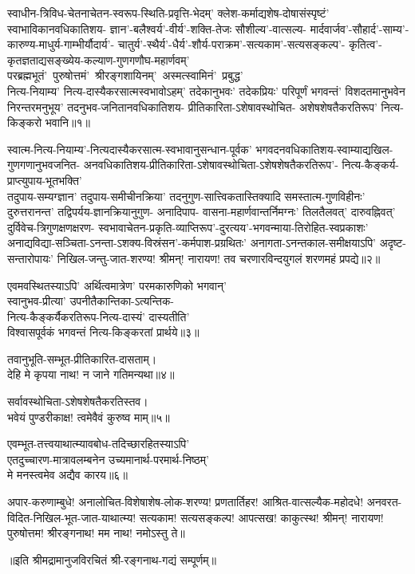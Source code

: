 
\begin{flushleft}
स्वाधीन-त्रिविध-चेतनाचेतन-स्वरूप-स्थिति-प्रवृत्ति-भेदम्'
क्लेश-कर्माद्यशेष-दोषासंस्पृष्टं' स्वाभाविकानवधिकातिशय-
ज्ञान'-बलैश्वर्य'-वीर्य'-शक्ति-तेजः सौशील्य'-वात्सल्य-
मार्दवार्जव'-सौहार्द'-साम्य'-कारुण्य-माधुर्य-गाम्भीर्यौदार्य'-
चातुर्य'-स्थैर्य'-धैर्य'-शौर्य-पराक्रम'-सत्यकाम'-सत्यसङ्कल्प'-
कृतित्व'-कृतज्ञताद्यसङ्ख्येय-कल्याण-गुणगणौघ-महार्णवम्'
\mbox{परब्रह्मभूतं' पुरुषोत्तमं' श्रीरङ्गशायिनम्' अस्मत्स्वामिनं' प्रबुद्ध'}\\
नित्य-नियाम्य' नित्य-दास्यैकरसात्मस्वभावोऽहम्'
तदेकानुभवः' तदेकप्रियः' परिपूर्णं भगवन्तं'
विशदतमानुभवेन निरन्तरमनुभूय' तदनुभव-जनितानवधिकातिशय-%
प्रीतिकारिता-ऽशेषावस्थोचित-
अशेषशेषतैकरतिरूप' नित्य-किङ्करो भवानि॥१॥


स्वात्म-नित्य-नियाम्य'-नित्यदास्यैकरसात्म-स्वभावानुसन्धान-पूर्वक'
भगवदनवधिकातिशय-स्वाम्याद्यखिल-गुणगणानुभवजनित-
अनवधिकातिशय-प्रीतिकारिता-ऽशेषावस्थोचिता-ऽशेषशेषतैकरतिरूप'-%
नित्य-कैङ्कर्य-प्राप्त्युपाय-भूतभक्ति'\\
तदुपाय-सम्यग्ज्ञान' तदुपाय-समीचीनक्रिया'
तदनुगुण-सात्त्विकतास्तिक्यादि समस्तात्म-गुणविहीनः'
दुरुत्तरानन्त' तद्विपर्यय-ज्ञानक्रियानुगुण-%
अनादिपाप- वासना-महार्णवान्तर्निमग्नः'
तिलतैलवत्' दारुवह्निवत्' दुर्विवेच-त्रिगुणक्षणक्षरण-%
स्वभावाचेतन-प्रकृति-व्याप्तिरूप'-दुरत्यय'-भगवन्माया-तिरोहित-स्वप्रकाशः'
अनाद्यविद्या-सञ्चिता-ऽनन्ता-ऽशक्य-विस्रंसन'-कर्मपाश-प्रग्रथितः'
अनागता-ऽनन्तकाल-समीक्षयाऽपि' अदृष्ट-सन्तारोपायः'
निखिल-जन्तु-जात-शरण्य! श्रीमन्! नारायण!
तव चरणारविन्दयुगलं शरणमहं प्रपद्ये॥२॥

एवमवस्थितस्याऽपि' अर्थित्वमात्रेण' परमकारुणिको भगवान्'\\
स्वानुभव-प्रीत्या' उपनीतैकान्तिका-ऽत्यन्तिक-\\
नित्य-कैङ्कर्यैकरतिरूप-नित्य-दास्यं' दास्यतीति' \\
विश्वासपूर्वकं भगवन्तं नित्य-किङ्करतां प्रार्थये॥३॥

तवानुभूति-सम्भूत-प्रीतिकारित-दासताम्।\\
देहि मे कृपया नाथ! न जाने गतिमन्यथा॥४॥

सर्वावस्थोचिता-ऽशेषशेषतैकरतिस्तव।\\
भवेयं पुण्डरीकाक्ष! त्वमेवैवं कुरुष्व माम्॥५॥

एवम्भूत-तत्त्वयाथात्म्यावबोध-तदिच्छारहितस्याऽपि'\\
एतदुच्चारण-मात्रावलम्बनेन उच्यमानार्थ-परमार्थ-निष्ठम्'\\
मे मनस्त्वमेव अद्यैव कारय॥६॥

अपार-करुणाम्बुधे! अनालोचित-विशेषाशेष-लोक-शरण्य!
प्रणतार्तिहर! आश्रित-वात्सल्यैक-महोदधे!
अनवरत-विदित-निखिल-भूत-जात-याथात्म्य!
सत्यकाम! सत्यसङ्कल्प! आपत्सख! काकुत्स्थ! श्रीमन्!
नारायण! पुरुषोत्तम! श्रीरङ्गनाथ! मम नाथ! नमोऽस्तु ते॥
\end{flushleft}
\centerline{॥इति श्रीमद्रामानुजविरचितं श्री-रङ्गनाथ-गद्यं सम्पूर्णम्॥}
